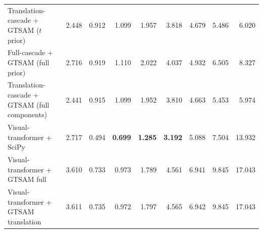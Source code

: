 \documentclass[11pt]{article}
\newcommand{\best}[1]{\textbf{#1}}
\begin{document}
\begin{landscape}
\begin{table}[H]
{\begin{tabular}{lrrrrrrrr}
Translation-cascade + GTSAM ($t$ prior) & 2.448 & 0.912 & 1.099 & 1.957 & 3.818 & 4.679 & 5.486 & 6.020\\
Full-cascade + GTSAM (full prior) & 2.716 & 0.919 & 1.110 & 2.022 & 4.037 & 4.932 & 6.505 & 8.327\\
Translation-cascade + GTSAM (full components) & 2.441 & 0.915 & 1.099 & 1.952 & 3.810 & 4.663 & 5.453 & 5.974\\
Visual-transformer + SciPy & 2.717 & 0.494 & \best{0.699} & \best{1.285} & \best{3.192} & 5.088 & 7.504 & 13.932\\
Visual-transformer + GTSAM full & 3.610 & 0.733 & 0.973 & 1.789 & 4.561 & 6.941 & 9.845 & 17.043\\
Visual-transformer + GTSAM translation & 3.611 & 0.735 & 0.972 & 1.797 & 4.565 & 6.942 & 9.845 & 17.043\\
\bottomrule
\end{tabular}}
\end{table}
\end{landscape}
\end{document}
